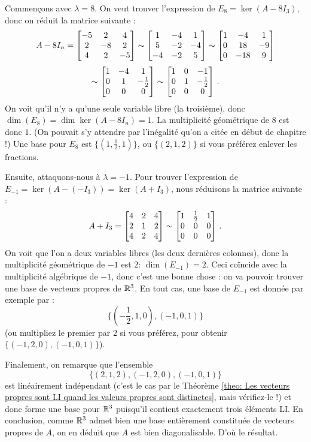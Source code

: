 \begin{myprob}
\begin{mysol}
Commençons avec $\lambda = 8$. On veut trouver l'expression de $E_8 = \ker(A-8I_3)$, donc on r\'eduit la matrice suivante :
$$
A-8I_n=\left[ \begin{matrix} -5 &  2      & 4 \\ 
2          & -8 & 2 \\ 
4          & 2      & -5 \end{matrix} \right]
\sim  
\left[ \begin{matrix} 
1 & -4 & 1\\
5 & -2 & -4\\
-4 & -2 & 5 \end{matrix} \right]
\sim
\left[ \begin{matrix} 
1 & -4 & 1\\
0 & 18 & -9\\
0 & -18 & 9 \end{matrix} \right]
$$
$$
\sim \left[ \begin{matrix} 1 & -4 & 1\\
0 & 1 & -\frac12 \\
0 & 0 & 0 \end{matrix} \right]
\sim
\left[ \begin{matrix} 1 & 0 & -1\\ 0 & 1 & -\frac12 \\ 0 & 0 & 0 \end{matrix} \right]\,.
$$
On voit qu'il n'y a qu'une seule variable libre (la troisième), donc $\dim(E_8)=\dim \ker(A-8I_n) =1$. La multiplicité géométrique de $8$ est donc $1$. (On pouvait s'y attendre par l'inégalité qu'on a citée en début de chapitre !)
Une base pour $E_8$ est $\{(1,\frac12, 1)\}$, ou $\{(2,1,2)\}$ si vous
préférez enlever les fractions.


Ensuite, attaquons-nous à $\lambda =-1$. Pour trouver l'expression de $E_{-1} = \ker(A-(-I_3))=\ker(A+I_3)$, nous réduisons la matrice suivante :
$$
A+I_3=\left[ \begin{matrix} 4 & 2              & 4 \\ 
2          & 1         & 2 \\ 
4          & 2     & 4 \end{matrix} \right]
\sim
\left[ \begin{matrix} 1 & \frac12 & 1\\ 0 & 0 & 0\\ 0 & 0 & 0 \end{matrix} \right]\,.
$$
On voit que l'on a deux variables libres (les deux dernières colonnes), donc la multiplicité géométrique de $-1$ est $2$: $\dim(E_{-1}) = 2$. Ceci coïncide avec
la multiplicité algébrique de $-1$, donc c'est une bonne chose : on va pouvoir trouver une base de vecteurs propres de $\mathbb{R}^3$.  En tout cas, une base de $E_{-1}$ est donnée par exemple par :
$$
\{ (-{\textstyle\frac12}, 1, 0) , (-1, 0, 1)\}
$$
(ou multipliez le premier par 2 si vous préférez, pour obtenir $\{ (-1, 2, 0), (-1,0,1)\}$).


Finalement, on remarque que l'ensemble
$$
\{ (2,1,2), (-1,2,0), (-1,0,1)\}
$$
est linéairement indépendant (c'est le cas par le Théorème \ref{theo: Les vecteurs propres sont LI quand les valeurs propres sont distinctes}, mais vérifiez-le !) et donc forme une base pour 
$\mathbb{R}^3$ puisqu'il contient exactement trois éléments LI. En conclusion, comme $\mathbb{R}^3$ admet bien une base entièrement constituée de vecteurs propres
de $A$, on en déduit que $A$ est bien diagonalisable. D'où le résultat.
\end{mysol}\end{myprob}

